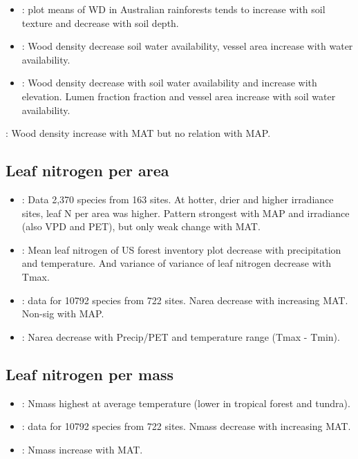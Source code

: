 \documentclass[a4paper,11pt]{article}
\begin{document}
\begin{itemize}
\item \citet{Kooyman-2010}: plot means of WD in Australian rainforests tends to increase with soil texture and decrease with soil depth.

\item \citet{Preston-2006}: Wood density decrease soil water availability, vessel area increase with water availability.

\item \citet{Cornwell-2009}: Wood density decrease with soil water availability and increase with elevation. Lumen fraction fraction and vessel area increase with soil water availability.
\end{itemize}

\citet{Stahl-2014}: Wood density increase with MAT but no relation with MAP.

\subsection{Leaf nitrogen per area}

\begin{itemize}
\item \citet{Wright-2005}: Data 2,370 species from 163 sites. At hotter, drier and higher irradiance sites, leaf N per area was higher. Pattern strongest with MAP and irradiance (also VPD and PET), but only weak change with MAT.

\item \citet{Swenson-2010}: Mean leaf nitrogen of US forest inventory plot decrease with precipitation and temperature. And variance of variance of leaf nitrogen decrease with Tmax.

\item \citet{Moles-2014}: data for 10792 species from 722 sites. Narea decrease with increasing MAT. Non-sig with MAP.

\item \citet{Maire-2015}: Narea decrease with Precip/PET and temperature range (Tmax - Tmin).

\end{itemize}

\subsection{Leaf nitrogen per mass}

\begin{itemize}
\item \citet{Reich-2004}: Nmass highest at average temperature (lower in tropical forest and tundra).

\item \citet{Moles-2014}: data for 10792 species from 722 sites. Nmass decrease with increasing MAT.

\item \citet{Ordonez-2009}: Nmass increase with MAT.
\end{itemize}
\end{document}
